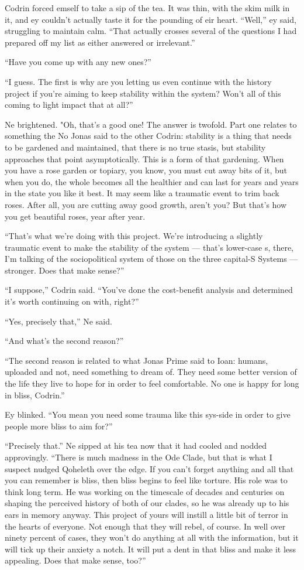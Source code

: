 Codrin forced emself to take a sip of the tea. It was thin, with the skim milk in it, and ey couldn't actually taste it for the pounding of eir heart. ``Well,'' ey said, struggling to maintain calm. ``That actually crosses several of the questions I had prepared off my list as either answered or irrelevant.''

``Have you come up with any new ones?''

``I guess. The first is why are you letting us even continue with the history project if you're aiming to keep stability within the system? Won't all of this coming to light impact that at all?''

Ne brightened. "Oh, that's a good one! The answer is twofold. Part one relates to something the No Jonas said to the other Codrin: stability is a thing that needs to be gardened and maintained, that there is no true stasis, but stability approaches that point asymptotically. This is a form of that gardening. When you have a rose garden or topiary, you know, you must cut away bits of it, but when you do, the whole becomes all the healthier and can last for years and years in the state you like it best. It may seem like a traumatic event to trim back roses. After all, you are cutting away good growth, aren't you? But that's how you get beautiful roses, year after year.

``That's what we're doing with this project. We're introducing a slightly traumatic event to make the stability of the system — that's lower-case s, there, I'm talking of the sociopolitical system of those on the three capital-S Systems — stronger. Does that make sense?''

``I suppose,'' Codrin said. ``You've done the cost-benefit analysis and determined it's worth continuing on with, right?''

``Yes, precisely that,'' Ne said.

``And what's the second reason?''

``The second reason is related to what Jonas Prime said to Ioan: humans, uploaded and not, need something to dream of. They need some better version of the life they live to hope for in order to feel comfortable. No one is happy for long in bliss, Codrin.''

Ey blinked. ``You mean you need some trauma like this sys-side in order to give people more bliss to aim for?''

``Precisely that.'' Ne sipped at his tea now that it had cooled and nodded approvingly. ``There is much madness in the Ode Clade, but that is what I suspect nudged Qoheleth over the edge. If you can't forget anything and all that you can remember is bliss, then bliss begins to feel like torture. His role was to think long term. He was working on the timescale of decades and centuries on shaping the perceived history of both of our clades, so he was already up to his ears in memory anyway. This project of yours will instill a little bit of terror in the hearts of everyone. Not enough that they will rebel, of course. In well over ninety percent of cases, they won't do anything at all with the information, but it will tick up their anxiety a notch. It will put a dent in that bliss and make it less appealing. Does that make sense, too?''

